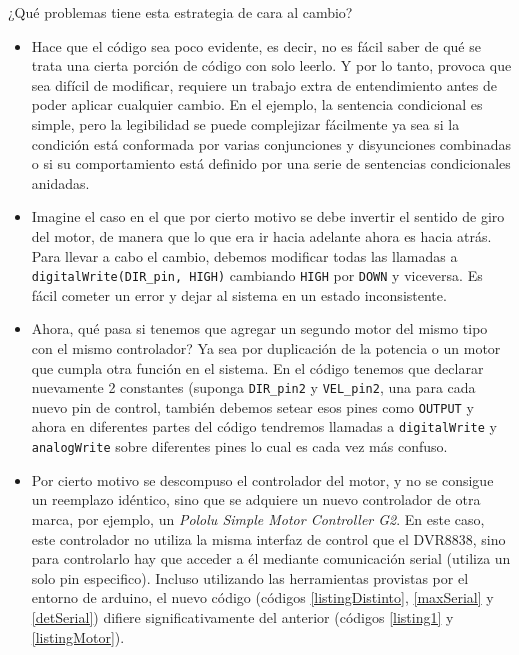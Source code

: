 ¿Qué problemas tiene esta estrategia de cara al cambio?
\begin{itemize}
    \item Hace que el código sea poco evidente, es decir, no es fácil saber de qué se trata una cierta porción de código con solo leerlo. Y por lo tanto, provoca que sea difícil de modificar, requiere un trabajo extra de entendimiento antes de poder aplicar cualquier cambio. En el ejemplo, la sentencia condicional es simple, pero la legibilidad se puede complejizar fácilmente ya sea si la condición está conformada por varias conjunciones y disyunciones combinadas o si su comportamiento está definido por una serie de sentencias condicionales anidadas. 
    \item Imagine el caso en el que por cierto motivo se debe invertir el sentido de giro del motor, de manera que lo que era ir hacia adelante ahora es hacia atrás. Para llevar a cabo el cambio, debemos modificar todas las llamadas a \verb|digitalWrite(DIR_pin, HIGH)| cambiando \verb|HIGH| por \verb|DOWN| y viceversa. Es fácil cometer un error y dejar al sistema en un estado inconsistente.
    \item Ahora, qué pasa si tenemos que agregar un segundo motor del mismo tipo con el mismo controlador? Ya sea por duplicación de la potencia o un motor que cumpla otra función en el sistema. En el código tenemos que declarar nuevamente 2 constantes (suponga \verb|DIR_pin2| y \verb|VEL_pin2|, una para cada nuevo pin de control, también debemos setear esos pines como \verb|OUTPUT| y ahora en diferentes partes del código tendremos llamadas a \verb|digitalWrite| y \verb|analogWrite| sobre diferentes pines lo cual es cada vez más confuso.
    \item Por cierto motivo se descompuso el controlador del motor, y no se consigue un reemplazo idéntico, sino que se adquiere un nuevo controlador de otra marca, por ejemplo, un \textit{Pololu Simple Motor Controller G2}. En este caso, este controlador no utiliza la misma interfaz de control que el \gls{DVR8838}, sino para controlarlo hay que acceder a él mediante comunicación serial (utiliza un solo pin especifico). Incluso utilizando las herramientas provistas por el entorno de \gls{arduino}, el nuevo código (códigos \ref{listingDistinto}, \ref{maxSerial} y \ref{detSerial}) difiere significativamente del anterior (códigos \ref{listing1} y \ref{listingMotor}).
\begin{lstlisting}[caption=Configuración del motor paso a paso que utiliza comunicación serie., label={listingDistinto}]

\end{lstlisting}
\end{itemize}
